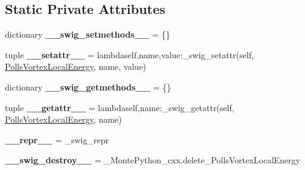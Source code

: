 \subsection*{Static Private Attributes}
\begin{DoxyCompactItemize}
\item 
\hypertarget{classMontePython__cxx_1_1PollsVortexLocalEnergy_a7c6829a2748bb707457f0c729d4c9cde}{}dictionary {\bfseries \+\_\+\+\_\+swig\+\_\+setmethods\+\_\+\+\_\+} = \{\}\label{classMontePython__cxx_1_1PollsVortexLocalEnergy_a7c6829a2748bb707457f0c729d4c9cde}

\item 
\hypertarget{classMontePython__cxx_1_1PollsVortexLocalEnergy_a89fcd35858fde8ab0ea3df9b6f916fa0}{}tuple {\bfseries \+\_\+\+\_\+setattr\+\_\+\+\_\+} = lambdaself,name,value\+:\+\_\+swig\+\_\+setattr(self, \hyperlink{classMontePython__cxx_1_1PollsVortexLocalEnergy}{Polls\+Vortex\+Local\+Energy}, name, value)\label{classMontePython__cxx_1_1PollsVortexLocalEnergy_a89fcd35858fde8ab0ea3df9b6f916fa0}

\item 
\hypertarget{classMontePython__cxx_1_1PollsVortexLocalEnergy_aecdcffc4784c77d8719c6d368565dddf}{}dictionary {\bfseries \+\_\+\+\_\+swig\+\_\+getmethods\+\_\+\+\_\+} = \{\}\label{classMontePython__cxx_1_1PollsVortexLocalEnergy_aecdcffc4784c77d8719c6d368565dddf}

\item 
\hypertarget{classMontePython__cxx_1_1PollsVortexLocalEnergy_af93c3497beefaba0b4bb2db17149553e}{}tuple {\bfseries \+\_\+\+\_\+getattr\+\_\+\+\_\+} = lambdaself,name\+:\+\_\+swig\+\_\+getattr(self, \hyperlink{classMontePython__cxx_1_1PollsVortexLocalEnergy}{Polls\+Vortex\+Local\+Energy}, name)\label{classMontePython__cxx_1_1PollsVortexLocalEnergy_af93c3497beefaba0b4bb2db17149553e}

\item 
\hypertarget{classMontePython__cxx_1_1PollsVortexLocalEnergy_a61b92e7199bef276c388bd33fd6d60c2}{}{\bfseries \+\_\+\+\_\+repr\+\_\+\+\_\+} = \+\_\+swig\+\_\+repr\label{classMontePython__cxx_1_1PollsVortexLocalEnergy_a61b92e7199bef276c388bd33fd6d60c2}

\item 
\hypertarget{classMontePython__cxx_1_1PollsVortexLocalEnergy_ab74195797613674080a04028f40131d2}{}{\bfseries \+\_\+\+\_\+swig\+\_\+destroy\+\_\+\+\_\+} = \+\_\+\+Monte\+Python\+\_\+cxx.\+delete\+\_\+\+Polls\+Vortex\+Local\+Energy\label{classMontePython__cxx_1_1PollsVortexLocalEnergy_ab74195797613674080a04028f40131d2}

\end{DoxyCompactItemize}


